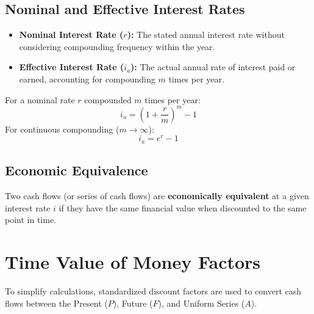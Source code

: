 \documentclass[12pt,a4paper]{article}
\begin{document}
\subsection{Nominal and Effective Interest Rates}
\begin{itemize}[leftmargin=*, itemsep=4pt]
  \item \textbf{Nominal Interest Rate ($r$):} The stated annual interest rate without considering compounding frequency within the year.
  \item \textbf{Effective Interest Rate ($i_a$):} The actual annual rate of interest paid or earned, accounting for compounding $m$ times per year.
\end{itemize}

\begin{tcolorbox}[formulabox, title={\textbf{Effective Interest Rate Formulas}}]
For a nominal rate $r$ compounded $m$ times per year:
\begin{equation}
  i_a = \left( 1 + \frac{r}{m} \right)^m - 1
\end{equation}
For continuous compounding ($m \to \infty$):
\begin{equation}
  i_a = e^r - 1
\end{equation}
\end{tcolorbox}

\subsection{Economic Equivalence}
Two cash flows (or series of cash flows) are \textbf{economically equivalent} at a given interest rate $i$ if they have the same financial value when discounted to the same point in time.

\section{Time Value of Money Factors}

To simplify calculations, standardized discount factors are used to convert cash flows between the Present ($P$), Future ($F$), and Uniform Series ($A$).
\end{document}
